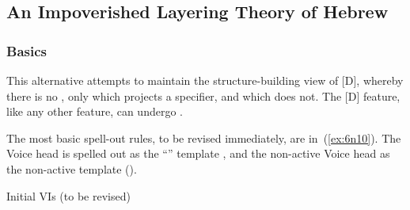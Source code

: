 \begin{exe}
\begin{xlist}
\begin{exe}
\begin{exe}
\begin{xlist}
\begin{exe}
\begin{exe}
\begin{exe}
\begin{exe}
\begin{exe}
\begin{xlist}
\begin{exe}
\begin{table}
    \caption{Derivational triplets in Hebrew\label{table:aas:triplets}}
\end{table}

	\subsection{An Impoverished Layering Theory of Hebrew} \label{aas:jim:pros}
		\subsubsection{Basics}
This alternative attempts to maintain the structure-building view of [D], whereby there is no , only {\vds} which projects a specifier, and {\vzs} which does not. The [D] feature, like any other feature, can undergo .

The most basic spell-out rules, to be revised immediately, are in~(\ref{ex:6n10}). The  Voice head is spelled out as the ``'' template {\thif}, and the non-active Voice head as the non-active template (\tnif).
 \begin{exe}
 \ex  \label{ex:6n10}Initial VIs (to be revised) 
 \begin{xlist} 
 	\ex  {\vds} \lra~{\thif} 
 	\ex  {\vzs} \lra~{\tnif} 
 \z
\z 


\end{xlist}
\end{exe}
\end{exe}
\end{xlist}
\end{exe}
\end{exe}
\end{exe}
\end{exe}
\end{exe}
\end{xlist}
\end{exe}
\end{exe}
\end{xlist}
\end{exe}
